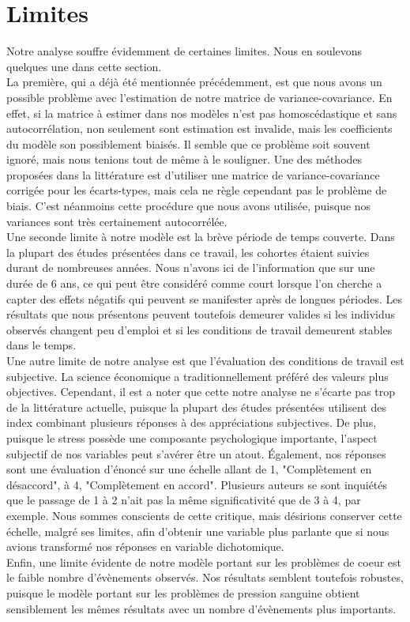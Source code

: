 \documentclass[a4paper, oneside, titlepage]{article}
\begin{document}
\section{Limites}
Notre analyse souffre évidemment de certaines limites. Nous en soulevons quelques une dans cette section.
\\
La première, qui a déjà été mentionnée précédemment, est que nous avons un possible problème avec l'estimation de notre matrice de variance-covariance. En effet, si la matrice à estimer dans nos modèles n'est pas homoscédastique et sans autocorrélation, non seulement sont estimation est invalide, mais les coefficients du modèle son possiblement biaisés. Il semble que ce problème soit souvent ignoré, mais nous tenions tout de même à le souligner. Une des méthodes proposées dans la littérature est d'utiliser une matrice de variance-covariance corrigée pour les écarts-types, mais cela ne règle cependant pas le problème de biais. C'est néanmoins cette procédure que nous avons utilisée, puisque nos variances sont très certainement autocorrélée.
\\
Une seconde limite à notre modèle est la brève période de temps couverte. Dans la plupart des études présentées dans ce travail, les cohortes étaient suivies durant de nombreuses années. Nous n'avons ici de l'information que sur une durée de 6 ans, ce qui peut être considéré comme court lorsque l'on cherche a capter des effets négatifs qui peuvent se manifester après de longues périodes. Les résultats que nous présentons peuvent toutefois demeurer valides si les individus observés changent peu d'emploi et si les conditions de travail demeurent stables dans le temps.
\\
Une autre limite de notre analyse est que l'évaluation des conditions de travail est subjective. La science économique a traditionnellement préféré des valeurs plus objectives. Cependant, il est a noter que cette notre analyse ne s'écarte pas trop de la littérature actuelle, puisque la plupart des études présentées utilisent des index combinant plusieurs réponses à des appréciations subjectives. De plus, puisque le stress possède une composante psychologique importante, l'aspect subjectif de nos variables peut s'avérer être un atout. Également, nos réponses sont une évaluation d'énoncé sur une échelle allant de 1, "Complètement en désaccord", à 4, "Complètement en accord". Plusieurs auteurs se sont inquiétés que le passage de 1 à 2 n'ait pas la même significativité que de 3 à 4, par exemple. Nous sommes conscients de cette critique, mais désirions conserver cette échelle, malgré ses limites, afin d'obtenir une variable plus parlante que si nous avions transformé nos réponses en variable dichotomique.
\\
Enfin, une limite évidente de notre modèle portant sur les problèmes de coeur est le faible nombre d'évènements observés. Nos résultats semblent toutefois robustes, puisque le modèle portant sur les problèmes de pression sanguine obtient sensiblement les mêmes résultats avec un nombre d'évènements plus importants.
\end{document}
